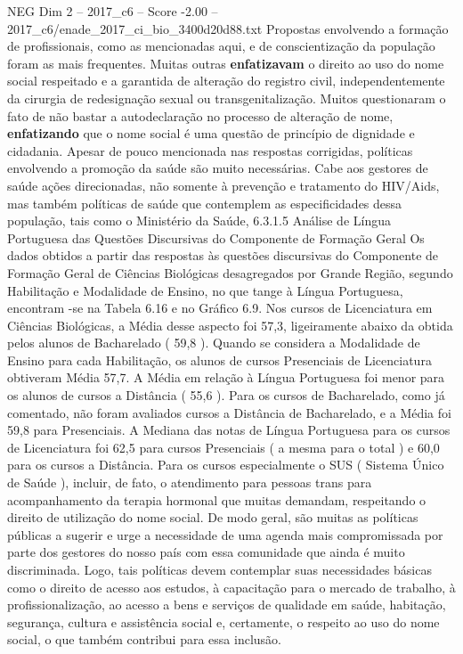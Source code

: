\begin{textsample}{NEG Dim 2 – 2017\_c6 – Score -2.00 – 2017\_c6/enade\_2017\_ci\_bio\_3400d20d88.txt}
Propostas envolvendo a formação de profissionais, como as mencionadas aqui, e de conscientização da população foram as mais frequentes.
Muitas outras \textbf{enfatizavam} o direito ao uso do nome social respeitado e a garantida de alteração do registro civil, independentemente da cirurgia de redesignação sexual ou transgenitalização.
Muitos questionaram o fato de não bastar a autodeclaração no processo de alteração de nome, \textbf{enfatizando} que o nome social é uma questão de princípio de dignidade e cidadania.
Apesar de pouco mencionada nas respostas corrigidas, políticas envolvendo a promoção da saúde são muito necessárias.
Cabe aos gestores de saúde ações direcionadas, não somente à prevenção e tratamento do HIV/Aids, mas também políticas de saúde que contemplem as especificidades dessa população, tais como o Ministério da Saúde, 6.3.1.5 Análise de Língua Portuguesa das Questões Discursivas do Componente de Formação Geral Os dados obtidos a partir das respostas às questões discursivas do Componente de Formação Geral de Ciências Biológicas desagregados por Grande Região, segundo Habilitação e Modalidade de Ensino, no que tange à Língua Portuguesa, encontram -se na Tabela 6.16 e no Gráfico 6.9.
Nos cursos de Licenciatura em Ciências Biológicas, a Média desse aspecto foi 57,3, ligeiramente abaixo da obtida pelos alunos de Bacharelado ( 59,8 ).
Quando se considera a Modalidade de Ensino para cada Habilitação, os alunos de cursos Presenciais de Licenciatura obtiveram Média 57,7.
A Média em relação à Língua Portuguesa foi menor para os alunos de cursos a Distância ( 55,6 ).
Para os cursos de Bacharelado, como já comentado, não foram avaliados cursos a Distância de Bacharelado, e a Média foi 59,8 para Presenciais.
A Mediana das notas de Língua Portuguesa para os cursos de Licenciatura foi 62,5 para cursos Presenciais ( a mesma para o total ) e 60,0 para os cursos a Distância.
Para os cursos especialmente o SUS ( Sistema Único de Saúde ), incluir, de fato, o atendimento para pessoas trans para acompanhamento da terapia hormonal que muitas demandam, respeitando o direito de utilização do nome social.
De modo geral, são muitas as políticas públicas a sugerir e urge a necessidade de uma agenda mais compromissada por parte dos gestores do nosso país com essa comunidade que ainda é muito discriminada.
Logo, tais políticas devem contemplar suas necessidades básicas como o direito de acesso aos estudos, à capacitação para o mercado de trabalho, à profissionalização, ao acesso a bens e serviços de qualidade em saúde, habitação, segurança, cultura e assistência social e, certamente, o respeito ao uso do nome social, o que também contribui para essa inclusão.

\end{textsample}
